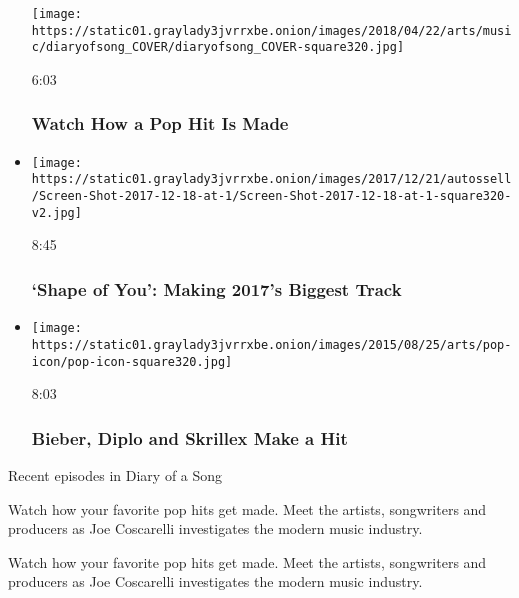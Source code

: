 \begin{itemize}
  \texttt{[image: https://static01.graylady3jvrrxbe.onion/images/2018/04/22/arts/music/diaryofsong\_COVER/diaryofsong\_COVER-square320.jpg]}

  6:03

  \hypertarget{watch-how-a-pop-hit-is-made}{%
  \subsubsection{Watch How a Pop Hit Is
  Made}\label{watch-how-a-pop-hit-is-made}}
\item
  \href{https://www.nytimes3xbfgragh.onion/video/arts/music/100000005469604/ed-sheeran-shape-of-you.html?action=click\&module=video-series-bar\&region=header\&pgtype=Article\&playlistId=video/diaryofasong}{}

  \texttt{[image: https://static01.graylady3jvrrxbe.onion/images/2017/12/21/autossell/Screen-Shot-2017-12-18-at-1/Screen-Shot-2017-12-18-at-1-square320-v2.jpg]}

  8:45

  \hypertarget{shape-of-you-making-2017s-biggest-track}{%
  \subsubsection{`Shape of You': Making 2017's Biggest
  Track}\label{shape-of-you-making-2017s-biggest-track}}
\item
  \href{https://www.nytimes3xbfgragh.onion/video/arts/music/100000003872410/bieber-diplo-and-skrillex-make-a-hit.html?action=click\&module=video-series-bar\&region=header\&pgtype=Article\&playlistId=video/diaryofasong}{}

  \texttt{[image: https://static01.graylady3jvrrxbe.onion/images/2015/08/25/arts/pop-icon/pop-icon-square320.jpg]}

  8:03

  \hypertarget{bieber-diplo-and-skrillex-make-a-hit}{%
  \subsubsection{Bieber, Diplo and Skrillex Make a
  Hit}\label{bieber-diplo-and-skrillex-make-a-hit}}
\end{itemize}

Recent episodes in Diary of a Song

Watch how your favorite pop hits get made. Meet the artists, songwriters
and producers as Joe Coscarelli investigates the modern music industry.

Watch how your favorite pop hits get made. Meet the artists, songwriters
and producers as Joe Coscarelli investigates the modern music industry.

